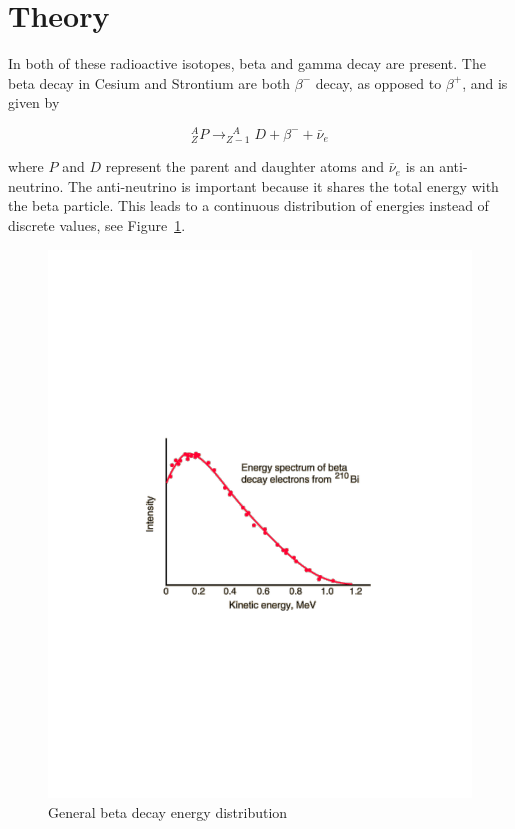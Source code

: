 
\section{Theory} 

\label{sec:theory} In both of these radioactive isotopes, beta and gamma decay are present. The beta decay in Cesium and Strontium are both $\beta^-$ decay, as opposed to $\beta^+$, and is given by 

\begin{equation}
	^{A}_{Z}P \to _{Z-1}^{~~~A}D + \beta^- + \bar{\nu}_e \nonumber 
\end{equation}%

where $P$ and $D$ represent the parent and daughter atoms and $ \bar{\nu}_e$ is an anti-neutrino. The anti-neutrino is important because it shares the total energy with the beta particle. This leads to a continuous distribution of energies instead of discrete values, see Figure~\ref{fig:Figures_betabi210}.

\begin{figure}
	[bp] \centering 
	\includegraphics[width=.5
	\textwidth]{./Figures/betabi210.pdf} \caption{General beta decay energy distribution\cite{Neary28031940}} \label{fig:Figures_betabi210} 
\end{figure}%

